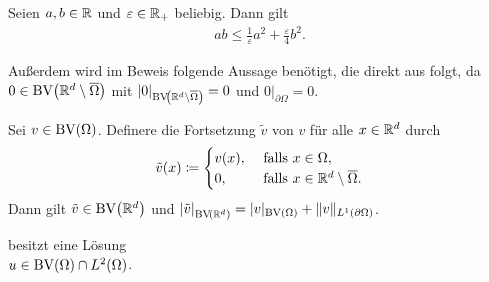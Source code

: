 \begin{lemma}
  \label{lem:young}
  Seien $a,b\in\mathbb{R}$ und $\varepsilon\in\mathbb{R}_+$ beliebig. Dann gilt
  \begin{align*}
    ab\leq\frac{1}{\varepsilon}a^2+\frac{\varepsilon}{4}b^2. 
  \end{align*}
\end{lemma}

Außerdem wird im Beweis folgende Aussage benötigt, die direkt aus \cite[S. 183,
Theorem 1]{EG92} folgt, da
$0\in\textup{BV}\!\left(\mathbb{R}^d\setminus\overline\Omega\right)$ mit
$|0|_{\textup{BV}\!\left(\mathbb{R}^d\setminus\overline\Omega\right)}=0$ und
$0|_{\partial\Omega}=0$.

\begin{lemma}
  \label{lem:bvExtension}
  Sei $v\in\textup{BV}(\Omega)$.
  Definere die Fortsetzung $\tilde{v}$ von $v$ für alle $x\in\mathbb{R}^d$ durch
  \begin{align*}
    \tilde{v}(x)\coloneqq
    \begin{cases}
      v(x),  &\text{ falls } x\in\Omega,\\
      0,     &\text{ falls } x\in\mathbb{R}^d\setminus\overline\Omega.
    \end{cases} 
  \end{align*}
  Dann gilt $\tilde{v}\in\textup{BV}\!\left(\mathbb{R}^d\right)$ und
  $\left|\tilde{v}\right|_{\textup{BV}\!\left(\mathbb{R}^d\right)}
  = |v|_{\textup{BV}(\Omega)}+\Vert v\Vert_{L^1(\partial\Omega)}$.
\end{lemma}

\begin{theorem}
  \label{thm:contProblemExistence}
   besitzt eine Lösung \\$u\in\textup{BV}(\Omega)\cap
  L^2(\Omega)$.
\end{theorem}

